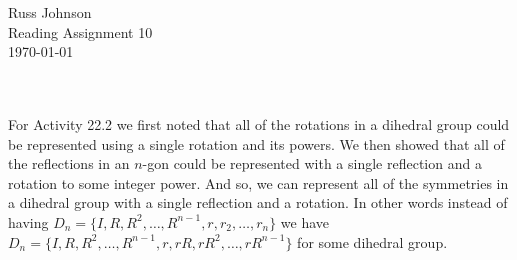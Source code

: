 \documentclass[11pt,a4paper]{article}
\begin{document}
\begin{flushright}
Russ Johnson\\
Reading Assignment 10\\
\today\\
\end{flushright}
~\\
~\\
For Activity 22.2 we first noted that all of the rotations in a dihedral group could be represented using a single rotation and its powers. We then showed that all of the reflections in an $n$-gon could be represented with a single reflection and a rotation to some integer power. And so, we can represent all of the symmetries in a dihedral group with a single reflection and a rotation. In other words instead of having $D_n=\{I,R,R^2,\ldots, R^{n-1},r,r_2,\ldots,r_n\}$ we have $D_n=\{I,R,R^2,\ldots, R^{n-1},r,rR,rR^2, \ldots,rR^{n-1}\}$ for some dihedral group.
\end{document}
